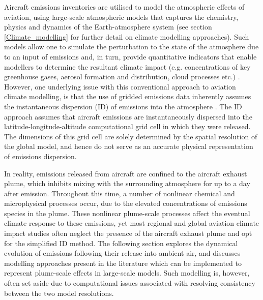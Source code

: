 Aircraft emissions inventories are utilised to model the atmospheric effects of aviation, using large-scale atmospheric models that captures the chemistry, physics and dynamics of the Earth-atmosphere system (see section \ref{Climate_modelling} for further detail on climate modelling approaches). Such models allow one to simulate the perturbation to the state of the atmosphere due to an input of emissions and, in turn, provide quantitative indicators that enable modellers to determine the resultant climate impact (e.g. concentrations of key greenhouse gases, aerosol formation and distribution, cloud processes etc.) \cite{Jacobson2005}. However, one underlying issue with this conventional approach to aviation climate modelling, is that the use of gridded emissions data inherently assumes the instantaneous dispersion (ID) of emissions into the atmosphere \cite{Petry1998}. The ID approach assumes that aircraft emissions are instantaneously dispersed into the latitude-longitude-altitude computational grid cell in which they were released. The dimensions of this grid cell are solely determined by the spatial resolution of the global model, and hence do not serve as an accurate physical representation of emissions dispersion.

In reality, emissions released from aircraft are confined to the aircraft exhaust plume, which inhibits mixing with the surrounding atmosphere for up to a day after emission. Throughout this time, a number of nonlinear chemical and microphysical processes occur, due to the elevated concentrations of emissions species in the plume. These nonlinear plume-scale processes affect the eventual climate response to these emissions, yet most regional and global aviation climate impact studies \cite{Cariolle2009} often neglect the presence of the aircraft exhaust plume and opt for the simplified ID method. The following section explores the dynamical evolution of emissions following their release into ambient air, and discusses modelling approaches present in the literature which can be implemented to represent plume-scale effects in large-scale models. Such modelling is, however, often set aside due to computational issues associated with resolving consistency between the two model resolutions. 





